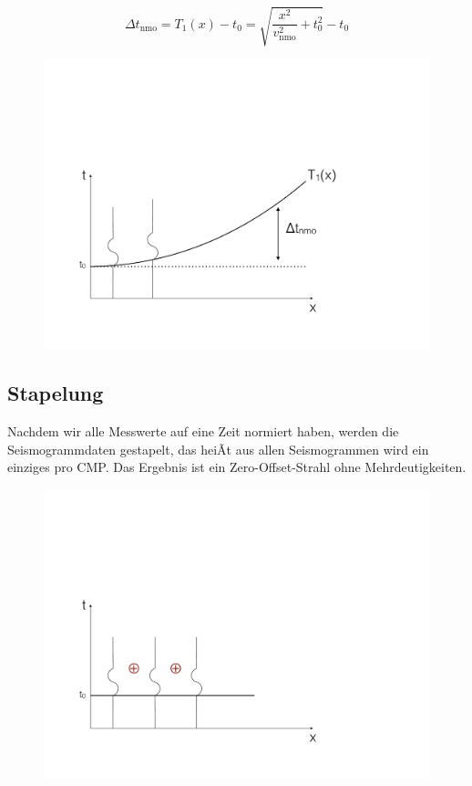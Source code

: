 \begin{equation*}
	\Delta t_{\text{nmo}} = T_1(x) - t_0 = \sqrt{\frac{x^2}{v_{\text{nmo}}^2} + t_0^2} - t_0
\end{equation*}   

\begin{figure}[H]
	\centering
	\includegraphics[scale = 0.3]{ReflexionsseismikBilder/tnmoAnpassung}
\end{figure}

\subsection{Stapelung}
Nachdem wir alle Messwerte auf eine Zeit normiert haben, werden die Seismogrammdaten gestapelt, das heiÃt aus allen Seismogrammen wird ein einziges pro CMP. Das Ergebnis ist ein Zero-Offset-Strahl ohne Mehrdeutigkeiten.

\begin{figure}[H]
	\centering
	\includegraphics[width = \textwidth]{ReflexionsseismikBilder/Stapelung}
\end{figure}

